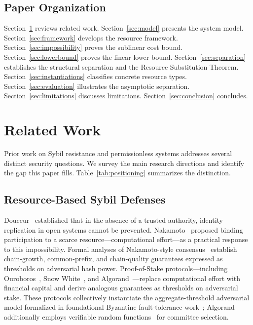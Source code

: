 \documentclass[manuscript,review]{acmart}
\theoremstyle{remark}
\begin{document}
	
	
	\subsection{Paper Organization}
	\label{ssec:organization}
	
	Section~\ref{sec:related} reviews related work.
	Section~\ref{sec:model} presents the system model.
	Section~\ref{sec:framework} develops the resource framework.
	Section~\ref{sec:impossibility} proves the sublinear cost bound.
	Section~\ref{sec:lowerbound} proves the linear lower bound.
	Section~\ref{sec:separation} establishes the structural
	separation and the Resource Substitution Theorem.
	Section~\ref{sec:instantiations} classifies concrete resource types.
	Section~\ref{sec:evaluation} illustrates the asymptotic separation.
	Section~\ref{sec:limitations} discusses limitations.
	Section~\ref{sec:conclusion} concludes.
	
	\section{Related Work}
	\label{sec:related}
	
	Prior work on Sybil resistance and permissionless systems
	addresses several distinct security questions.
	We survey the main research directions and identify
	the gap this paper fills.
	Table~\ref{tab:positioning} summarizes the distinction.
	
	\subsection{Resource-Based Sybil Defenses}
	\label{ssec:rw_resource}
	
	Douceur~\cite{douceur2002sybil} established that in the
	absence of a trusted authority, identity replication in
	open systems cannot be prevented.
	Nakamoto~\cite{nakamoto2008bitcoin} proposed binding
	participation to a scarce resource---computational
	effort---as a practical response to this impossibility.
	Formal analyses of Nakamoto-style
	consensus~\cite{garay2015backbone,ren2019nakamoto,pass2017hybrid,pass2017fruitchains}
	establish chain-growth, common-prefix, and chain-quality
	guarantees expressed as thresholds on adversarial hash power.
	Proof-of-Stake protocols---including
	Ouroboros~\cite{kiayias2017ouroboros,kiayias2018ouroboros,kiayias2020genesis},
	Snow White~\cite{pass2016snowwhite},
	and Algorand~\cite{gilad2017algorand}---replace
	computational effort with financial capital and derive
	analogous guarantees as thresholds on adversarial stake.
	These protocols collectively instantiate the
	aggregate-threshold adversarial model formalized in
	foundational Byzantine fault-tolerance
	work~\cite{lamport1982byzantine,castro1999pbft};
	Algorand additionally employs verifiable random
	functions~\cite{micali1999vrf} for committee selection.
	
\end{document}
